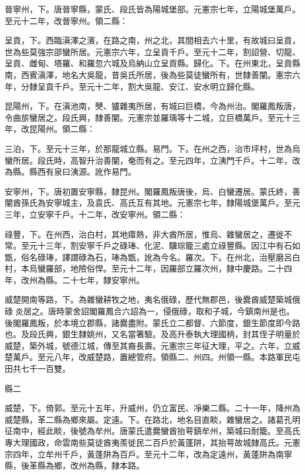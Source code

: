 \begin{pinyinscope}
 晉寧州，下。唐晉寧縣，蒙氏、段氏皆為陽城堡部。元憲宗七年，立陽城堡萬戶。至元十二年，改晉寧州。領二縣：



 呈貢，下。西臨滇澤之濱，在路之南，州之北，其間相去六十里，有故城曰呈貢，世為些莫強宗邵蠻所居。元憲宗六年，立呈貢千戶。至元十二年，割詔營、切龍、呈貢、雌甸、塔羅、和羅忽六城及烏納山立呈貢縣。歸化。下。在州東北，呈貢縣南，西賓滇澤，地名大吳龍，昔吳氏所居，後為些莫徒蠻所有，世隸善闡。憲宗六年，分隸呈貢千戶。至元十二年，割大吳龍、安江、安水明立歸化縣。



 昆陽州，下。在滇池南，僰、獹雜夷所居，有城曰巨橋，今為州治。閣羅鳳叛唐，令曲旂蠻居之。段氏興，隸善闡。元憲宗並羅瑀等十二城，立巨橋萬戶。至元十三年，改昆陽州。領二縣：



 三泊，下。至元十三年，於那龍城立縣。易門。下。在州之西，治市坪村，世為烏蠻所居。段氏時，高智升治善闡，奄而有之。至元四年，立洟門千戶。十二年，改為縣。縣西有泉曰洟源。訛作易門。



 安寧州，下。唐初置安寧縣，隸昆州。閣羅鳳叛唐後，烏、白蠻遷居。蒙氏終，善闡酋孫氏為安寧城主，及袁氏、高氏互有其地。元憲宗七年，隸陽城堡萬戶。至元三年，立安寧千戶。十二年，改安寧州。領二縣：



 祿豐，下。在州西，治白村，其地瘴熱，非大酋所居，惟烏、雜蠻居之，遷徙不常。至元十三年，割安寧千戶之碌琫、化泥、驥琮籠三處立祿豐縣。因江中有石如甑，俗名碌琫，譯謂碌為石，琫為甑，訛為今名。羅次。下。在州北，治壓磨呂白村，本烏蠻羅部，地險俗悍。至元十二年，因羅部立羅次州，隸中慶路。二十四年，改州為縣。二十七年，隸安寧州。



 威楚開南等路，下。為雜蠻耕牧之地，夷名俄碌，歷代無郡邑，後爨酋威楚築城俄碌炎居之。唐時蒙舍詔閣羅鳳合六詔為一，侵俄碌，取和子城，今鎮南州是也。後閣羅鳳叛，於本境立郡縣，諸爨盡附。蒙氏立二都督、六節度，銀生節度即今路也。及段氏興，銀生隸姚州，又名當箸驗。及高升泰執大理國柄，封其侄子明量於威楚，築外城，號德江城，傳至其裔長壽。元憲宗三年征大理，平之。六年，立威楚萬戶。至元八年，改威楚路，置總管府。領縣二、州四。州領一縣。本路軍民屯田共七千一百雙。



 縣二



 威楚，下。倚郭。至元十五年，升威州，仍立富民、凈樂二縣。二十一年，降州為威楚縣，革二縣為鄉來屬。定遠。下。在路北，地名目直睒，雜蠻居之。諸葛孔明征南中，經此睒，後號為牟州。唐蒙氏遣爨蠻酋抬萼鎮牟州，築城曰耐籠。至高氏專大理國政，命雲南些莫徒酋夷羨徙民二百戶於黃蓬阱，其抬萼故城隸高氏。元憲宗四年，立牟州千戶，黃蓬阱為百戶。至元十二年，改為定遠州，黃蓬阱為南寧縣，後革縣為鄉，改州為縣，隸本路。




\end{pinyinscope}
